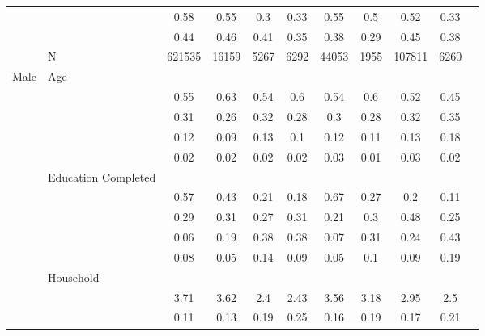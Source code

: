 \begin{table}[ht]
\begin{tabular}{l>{\raggedright\arraybackslash}p{3.2cm}|ccccccccc}
   & \multicolumn{1}{>{\raggedleft\arraybackslash}p{2.9cm}|}{\makebox[2.9cm][r]{Lives with Child }} & 0.58 & 0.55 & 0.3 & 0.33 & 0.55 & 0.5 & 0.52 & 0.33 \\ 
   & \multicolumn{1}{>{\raggedleft\arraybackslash}p{3.4cm}|}{\makebox[3.4cm][r]{Married/Cohabiting }} & 0.44 & 0.46 & 0.41 & 0.35 & 0.38 & 0.29 & 0.45 & 0.38 \\ 
   & N & 621535 & 16159 & 5267 & 6292 & 44053 & 1955 & 107811 & 6260 \\ 
  Male & Age &  &  &  &  &  &  &  &  \\ 
   & \multicolumn{1}{>{\raggedleft\arraybackslash}p{1.5cm}|}{\makebox[1.5cm][r]{60 - 69 }} & 0.55 & 0.63 & 0.54 & 0.6 & 0.54 & 0.6 & 0.52 & 0.45 \\ 
   & \multicolumn{1}{>{\raggedleft\arraybackslash}p{1.5cm}|}{\makebox[1.5cm][r]{70 - 79 }} & 0.31 & 0.26 & 0.32 & 0.28 & 0.3 & 0.28 & 0.32 & 0.35 \\ 
   & \multicolumn{1}{>{\raggedleft\arraybackslash}p{1.5cm}|}{\makebox[1.5cm][r]{80 - 89 }} & 0.12 & 0.09 & 0.13 & 0.1 & 0.12 & 0.11 & 0.13 & 0.18 \\ 
   & \multicolumn{1}{>{\raggedleft\arraybackslash}p{1.5cm}|}{\makebox[1.5cm][r]{90 plus }} & 0.02 & 0.02 & 0.02 & 0.02 & 0.03 & 0.01 & 0.03 & 0.02 \\ 
   & Education Completed &  &  &  &  &  &  &  &  \\ 
   & \multicolumn{1}{>{\raggedleft\arraybackslash}p{3.2cm}|}{\makebox[3.2cm][r]{Less than Primary }} & 0.57 & 0.43 & 0.21 & 0.18 & 0.67 & 0.27 & 0.2 & 0.11 \\ 
   & \multicolumn{1}{>{\raggedleft\arraybackslash}p{1.7cm}|}{\makebox[1.7cm][r]{Primary }} & 0.29 & 0.31 & 0.27 & 0.31 & 0.21 & 0.3 & 0.48 & 0.25 \\ 
   & \multicolumn{1}{>{\raggedleft\arraybackslash}p{2cm}|}{\makebox[2cm][r]{Secondary }} & 0.06 & 0.19 & 0.38 & 0.38 & 0.07 & 0.31 & 0.24 & 0.43 \\ 
   & \multicolumn{1}{>{\raggedleft\arraybackslash}p{2cm}|}{\makebox[2cm][r]{University }} & 0.08 & 0.05 & 0.14 & 0.09 & 0.05 & 0.1 & 0.09 & 0.19 \\ 
   & Household &  &  &  &  &  &  &  &  \\ 
   & \multicolumn{1}{>{\raggedleft\arraybackslash}p{2.7cm}|}{\makebox[2.7cm][r]{Household Size }} & 3.71 & 3.62 & 2.4 & 2.43 & 3.56 & 3.18 & 2.95 & 2.5 \\ 
   & \multicolumn{1}{>{\raggedleft\arraybackslash}p{2.2cm}|}{\makebox[2.2cm][r]{Lives Alone }} & 0.11 & 0.13 & 0.19 & 0.25 & 0.16 & 0.19 & 0.17 & 0.21 \\ 

\end{tabular}
\end{table}
